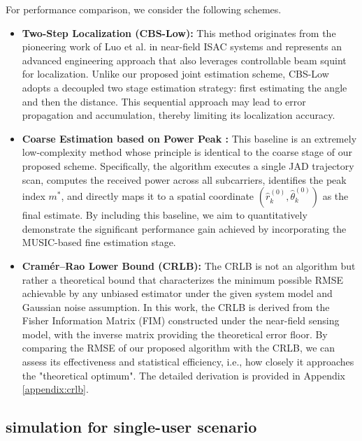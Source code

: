 \documentclass[lettersize,journal]{IEEEtran}
\begin{document}
For performance comparison, we consider the following schemes.
\begin{itemize}
	\item \textbf{Two-Step Localization (CBS-Low):} This method originates from the pioneering work of Luo et al. in near-field ISAC systems and represents an advanced engineering approach that also leverages controllable beam squint for localization. Unlike our proposed joint estimation scheme, CBS-Low adopts a decoupled two stage estimation strategy: first estimating the angle and then the distance. This sequential approach may lead to error propagation and accumulation, thereby limiting its localization accuracy\cite{luo2023beam}.
	\item \textbf{Coarse Estimation based on Power Peak :} This baseline is an extremely low-complexity method whose principle is identical to the coarse stage of our proposed scheme. Specifically, the algorithm executes a single JAD trajectory scan, computes the received power across all subcarriers, identifies the peak index $m^*$, and directly maps it to a spatial coordinate $(\hat{r}_{k}^{(0)}, \hat{\theta}_{k}^{(0)})$ as the final estimate. By including this baseline, we aim to quantitatively demonstrate the significant performance gain achieved by incorporating the MUSIC-based fine estimation stage.
	\item \textbf{Cramér–Rao Lower Bound (CRLB):} The CRLB is not an algorithm but rather a theoretical bound that characterizes the minimum possible RMSE achievable by any unbiased estimator under the given system model and Gaussian noise assumption. In this work, the CRLB is derived from the Fisher Information Matrix (FIM) constructed under the near-field sensing model, with the inverse matrix providing the theoretical error floor. By comparing the RMSE of our proposed algorithm with the CRLB, we can assess its effectiveness and statistical efficiency, i.e., how closely it approaches the "theoretical optimum". The detailed derivation is provided in Appendix \ref{appendix:crlb}.
\end{itemize}

\subsection{simulation for single-user scenario}
\end{document}
